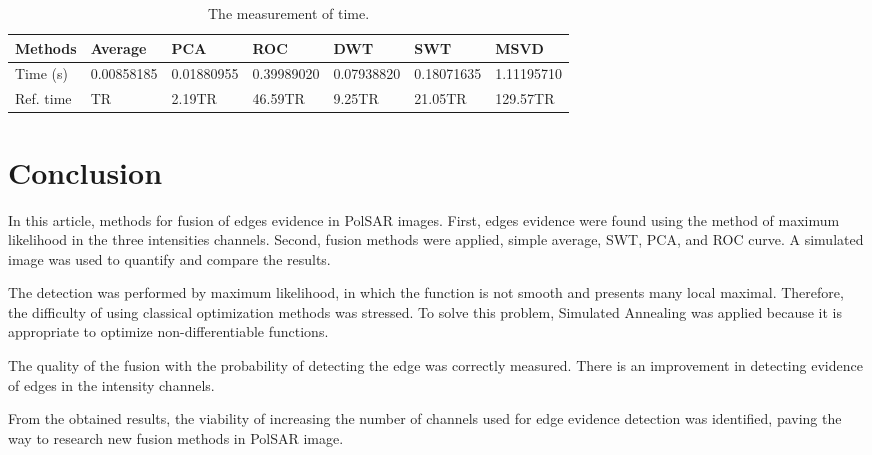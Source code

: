 \documentclass[conference]{IEEEtran}
\begin{document}
\begin{table}[hbt]
	\centering
	\tiny
	\caption{The measurement of time.}\label{metrica_de_tempo}
\begin{tabular}{@{}lllllll@{}} \toprule
	Methods       & Average    &   PCA      &  ROC      & DWT       &  SWT        &  MSVD \\ \midrule
	Time (s)      & 0.00858185 & 0.01880955 &0.39989020 &0.07938820 &  0.18071635 & 1.11195710  \\
    Ref. time     & TR & 2.19TR &46.59TR & 9.25TR   & 21.05TR & 129.57TR  \\ \bottomrule
\end{tabular}
\end{table}


\section{Conclusion}\label{sec_09}

In this article, methods for fusion of edges evidence in PolSAR images. 
First, edges evidence were found using the method of maximum likelihood in the three intensities channels. 
Second, fusion methods were applied, simple average, SWT, PCA, and ROC curve. A simulated image was used to quantify and compare the results. 

The detection was performed by maximum likelihood, in which the function is not smooth and presents many local maximal.
Therefore, the difficulty of using classical optimization methods was stressed. 
To solve this problem, Simulated Annealing was applied because it is appropriate to optimize non-differentiable functions.

The quality of the fusion with the probability of detecting the edge was correctly measured. There is an improvement in detecting evidence of edges in the intensity channels.

From the obtained results, the viability of increasing the number of channels used for edge evidence detection was identified, paving the way to research new fusion methods in PolSAR image.



\end{document}
